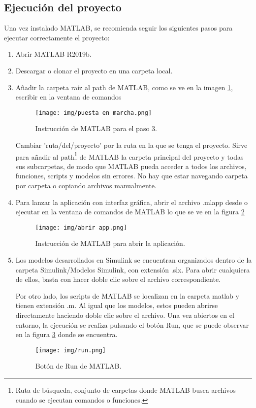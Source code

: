 \subsection{Ejecución del proyecto}
Una vez instalado MATLAB, se recomienda seguir los siguientes pasos para ejecutar correctamente el proyecto:
\begin{enumerate}
    \item Abrir MATLAB R2019b.
    \item Descargar o clonar el proyecto en una carpeta local.
    \item Añadir la carpeta raíz al path de MATLAB, como se ve en la imagen \ref{fig:instruccion}, escribir en la ventana de comandos
    \begin{figure}[H]
        \centering
        \texttt{[image: img/puesta en marcha.png]}
        \caption{Instrucción de MATLAB para el paso 3.}
        \label{fig:instruccion}
        
    \end{figure}
    Cambiar 'ruta/del/proyecto' por la ruta en la que se tenga el proyecto.
    Sirve para añadir al path\footnote{Ruta de búsqueda, conjunto de carpetas donde MATLAB busca archivos cuando se ejecutan comandos o funciones.} de MATLAB la carpeta principal del proyecto y todas sus subcarpetas, de modo que MATLAB pueda acceder a todos los archivos, funciones, scripts y modelos sin errores. No hay que estar navegando carpeta por carpeta o copiando archivos manualmente.
    \item Para lanzar la aplicación con interfaz gráfica, abrir el archivo .mlapp desde o ejecutar en la ventana de comandos de MATLAB lo que se ve en la figura \ref{fig:app abrir}
    \begin{figure}[H]
        \centering
        \texttt{[image: img/abrir app.png]}
        \caption{Instrucción de MATLAB para abrir la aplicación.}
        \label{fig:app abrir}
    \end{figure}
    \item Los modelos desarrollados en Simulink se encuentran organizados dentro de la carpeta Simulink/Modelos Simulink, con extensión .slx. Para abrir cualquiera de ellos, basta con hacer doble clic sobre el archivo correspondiente.
   
    Por otro lado, los scripts de MATLAB se localizan en la carpeta matlab y tienen extensión .m. Al igual que los modelos, estos pueden abrirse directamente haciendo doble clic sobre el archivo. 
    Una vez abiertos en el entorno, la ejecución se realiza pulsando el botón Run, que se puede observar en la figura \ref{fig:app run} donde se encuentra.

    \begin{figure}[H]
        \centering
        \texttt{[image: img/run.png]}
        \caption{Botón de Run de MATLAB.}
        \label{fig:app run}
        
    \end{figure}
\end{enumerate}



